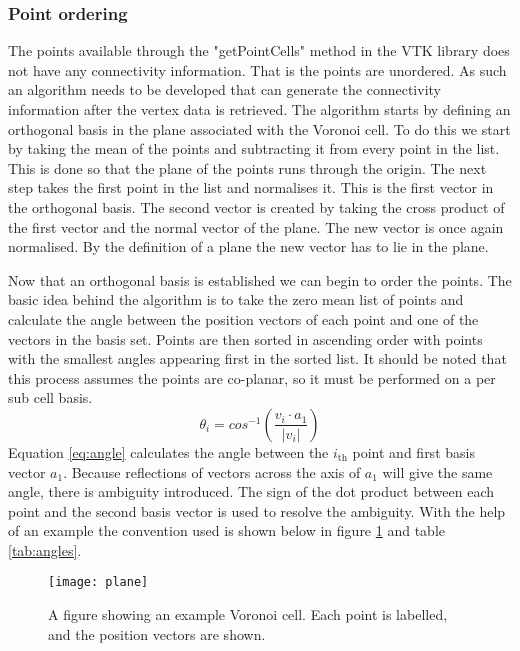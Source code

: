 \subsubsection*{Point ordering}
The points available through the "getPointCells" method in the VTK library does not have any connectivity information. That is the points are unordered. As such an algorithm needs to be developed that can generate the connectivity information after the vertex data is retrieved. The algorithm starts by defining an orthogonal basis in the plane associated with the Voronoi cell. To do this we start by taking the mean of the points and subtracting it from every point in the list. This is done so that the plane of the points runs through the origin. The next step takes the first point in the list and normalises it. This is the first vector in the orthogonal basis. The second vector is created by taking the cross product of the first vector and the normal vector of the plane. The new vector is once again normalised. By the definition of a plane the new vector has to lie in the plane. \par
Now that an orthogonal basis is established we can begin to order the points. The basic idea behind the algorithm is to take the zero mean list of points and calculate the angle between the position vectors of each point and one of the vectors in the basis set. Points are then sorted in ascending order with points with the smallest angles appearing first in the sorted list. It should be noted that this process assumes the points are co-planar, so it must be performed on a per sub cell basis. 
\begin{equation}
    \theta_i = cos^{-1}(\frac{v_i\cdot a_1}{|v_i|})
    \label{eq:angle}
\end{equation}
Equation \ref{eq:angle} calculates the angle between the $i_{\text{th}}$ point and first basis vector $a_1$. Because reflections of vectors across the axis of $a_1$ will give the same angle, there is ambiguity introduced. The sign of the dot product between each point and the second basis vector is used to resolve the ambiguity. With the help of an example the convention used is shown below in figure \ref{fig:planeVoro} and table \ref{tab:angles}.

\begin{figure}[h]
    \centering
    \texttt{[image: plane]}
    \caption{A figure showing an example Voronoi cell. Each point is labelled, and the position vectors are shown.}
    \label{fig:planeVoro}
\end{figure}

